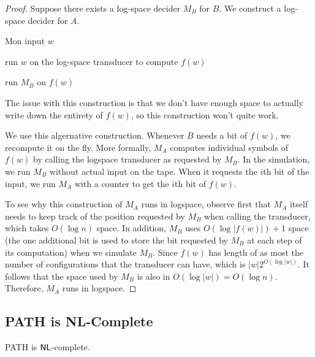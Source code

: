 \begin{proof}
    Suppose there exists a log-space decider $M_B$ for $B$. We construct a log-space decider for $A$.

    \begin{turing}{M}{on input $w$}
        \item run $w$ on the log-space transducer to compute $f(w)$ 
        \item run $M_B$ on $f(w)$ 
    \end{turing}

    The issue with this construction is that we don't have enough space to actually write down the entirety of $f(w)$, so this construction won't quite work.

    We use this algernative construction. Whenever $B$ needs a bit of $f(w)$, we recompute it on the fly. More formally, $M_A$ computes individual symbols of $f(w)$ by calling the logspace transducer as requested by $M_B$. In the simulation, we run $M_B$ without actual input on the tape. When it requests the $i$th bit of the input, we run $M_A$ with a counter to get the $i$th bit of $f(w)$.

    To see why this construction of $M_A$ runs in logspace, observe first that $M_A$ itself needs to keep track of the position requested by $M_B$ when calling the transducer, which takes $O(\log n)$ space. In addition, $M_B$ uses $O(\log |f(w)|) + 1$ space (the one additional bit is used to store the bit requested by $M_B$ at each step of its computation) when we simulate $M_B$. Since $f(w)$ has length of as most the number of configurations that the transducer can have, which is $|w| 2^{O(\log |w|)}$. It follows that the space used by $M_B$ is also in $O(\log |w|) = O(\log n)$. Therefore, $M_A$ runs in logspace.
\end{proof}

\subsection{PATH is NL-Complete}

\vspace{\parskip}

\begin{theorem}
    PATH is $\mathsf{NL}$-complete.
\end{theorem}

